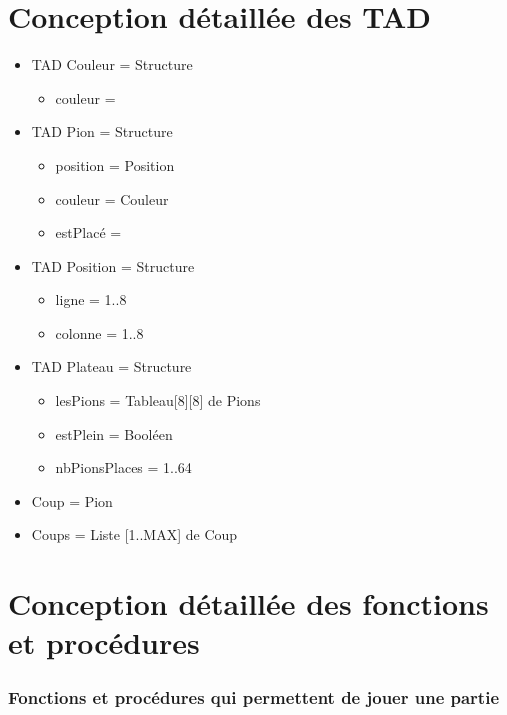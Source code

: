 \documentclass{report}
\begin{document}
        \section{Conception détaillée des TAD}
         \begin{itemize}
             \item TAD Couleur = Structure 
             \begin{itemize}
             \item couleur = \booleen
             \end{itemize}
             \item TAD Pion = Structure
             \begin{itemize}
                 \item position = Position
                 \item couleur = Couleur
                 \item estPlacé = \booleen
             \end{itemize}
             \item TAD Position = Structure
             \begin{itemize}
                 \item ligne = 1..8
                 \item colonne = 1..8
             \end{itemize}
             \item TAD Plateau = Structure
             \begin{itemize}
                 \item lesPions = Tableau[8][8] de Pions
                 \item estPlein = Booléen
                 \item nbPionsPlaces = 1..64
             \end{itemize}
             \item Coup = Pion
             \item Coups = Liste [1..MAX] de Coup
         \end{itemize}
         
         \section{Conception détaillée des fonctions et procédures}
         

            \subsubsection{Fonctions et procédures qui permettent de jouer une partie}
\end{document}
